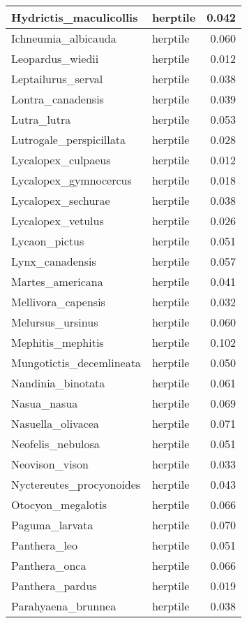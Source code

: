 \begin{table}
\begin{tabular}[t]{l|l|r}
\hline
Hydrictis\_maculicollis & herptile & 0.042\\
\hline
Ichneumia\_albicauda & herptile & 0.060\\
\hline
Leopardus\_wiedii & herptile & 0.012\\
\hline
Leptailurus\_serval & herptile & 0.038\\
\hline
Lontra\_canadensis & herptile & 0.039\\
\hline
Lutra\_lutra & herptile & 0.053\\
\hline
Lutrogale\_perspicillata & herptile & 0.028\\
\hline
Lycalopex\_culpaeus & herptile & 0.012\\
\hline
Lycalopex\_gymnocercus & herptile & 0.018\\
\hline
Lycalopex\_sechurae & herptile & 0.038\\
\hline
Lycalopex\_vetulus & herptile & 0.026\\
\hline
Lycaon\_pictus & herptile & 0.051\\
\hline
Lynx\_canadensis & herptile & 0.057\\
\hline
Martes\_americana & herptile & 0.041\\
\hline
Mellivora\_capensis & herptile & 0.032\\
\hline
Melursus\_ursinus & herptile & 0.060\\
\hline
Mephitis\_mephitis & herptile & 0.102\\
\hline
Mungotictis\_decemlineata & herptile & 0.050\\
\hline
Nandinia\_binotata & herptile & 0.061\\
\hline
Nasua\_nasua & herptile & 0.069\\
\hline
Nasuella\_olivacea & herptile & 0.071\\
\hline
Neofelis\_nebulosa & herptile & 0.051\\
\hline
Neovison\_vison & herptile & 0.033\\
\hline
Nyctereutes\_procyonoides & herptile & 0.043\\
\hline
Otocyon\_megalotis & herptile & 0.066\\
\hline
Paguma\_larvata & herptile & 0.070\\
\hline
Panthera\_leo & herptile & 0.051\\
\hline
Panthera\_onca & herptile & 0.066\\
\hline
Panthera\_pardus & herptile & 0.019\\
\hline
Parahyaena\_brunnea & herptile & 0.038\\

\end{tabular}
\end{table}
